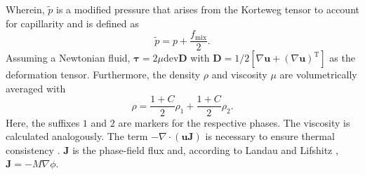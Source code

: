 Wherein, $\tilde{p}$ is a modified pressure that arises from the Korteweg tensor to account for capillarity and is defined as
\begin{equation}
    \tilde{p} = p + \frac{f_{\mathrm{mix}}}{2}.
\end{equation}
Assuming a Newtonian fluid, $\mathbf{\tau} = 2\mu \mathrm{dev}\mathbf{D}$ with $\mathbf{D} = 1/2[\nabla \mathbf{u}+(\nabla \mathbf{u})^{\mathrm{T}}]$ as the deformation tensor. Furthermore, the density $\rho$ and viscosity $\mu$ are volumetrically averaged with 
\begin{equation}
    \rho = \frac{1 + C}{2} \rho_1 +\frac{1 + C}{2} \rho_2.
\end{equation} 
Here, the suffixes $1$ and $2$ are markers for the respective phases. The viscosity is calculated analogously. The term $- \nabla \cdot(\mathbf{u}\mathbf{J})$ is necessary to ensure thermal consistency \cite{ding2007DiffuseInterfaceModel}. $\mathbf{J}$ is the phase-field flux and, according to Landau and Lifshitz , $\mathbf{J} = -M\nabla \phi$.


